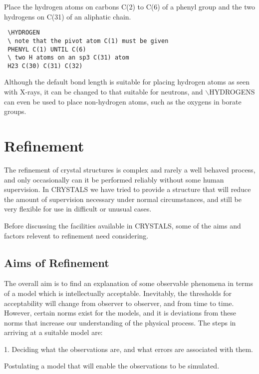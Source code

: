 \documentclass[10pt,a4paper]{report}
\begin{document}
Place the hydrogen atoms on carbons C(2) to C(6) of a phenyl group and
 the two hydrogens on C(31) of an aliphatic chain.

\small\begin{verbatim}
 \HYDROGEN
 \ note that the pivot atom C(1) must be given
 PHENYL C(1) UNTIL C(6)
 \ two H atoms on an sp3 C(31) atom
 H23 C(30) C(31) C(32)
\end{verbatim}\normalsize




Although the default bond length is suitable for placing hydrogen atoms
 as seen with X-rays, it can be changed to that suitable for neutrons,
 and $\backslash$HYDROGENS can even be used to place non-hydrogen atoms, such as
 the oxygens in borate groups.
\chapter{Refinement}


The refinement of  crystal structures is  complex and rarely a well behaved process, and only occasionally can it  be performed reliably without some human supervision. In CRYSTALS we have tried to provide a structure that will reduce the amount of supervision necessary under normal circumstances, and still be very flexible for use in difficult or unusual cases.

Before discussing the facilities available in CRYSTALS, some of the aims and factors relevent to refinement need considering.\section{Aims of Refinement}


The overall aim is to find an explanation of some observable phenomena
 in terms of a model which is intellectually acceptable. Inevitably, the
 thresholds for acceptability will change from observer to observer,
 and from time to time. However, certain norms exist for the models,
 and it is deviations from these norms that increase our understanding
 of the physical process. The steps in arriving at a suitable model are:





1. Deciding what the observations are, and what errors are associated
  with them.




Postulating a model that will enable the observations to be simulated.
\end{document}
